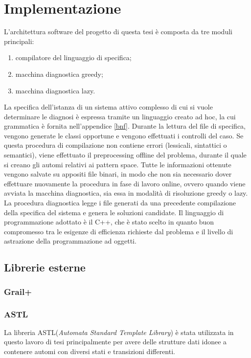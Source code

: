 \chapter{Implementazione}
L'architettura software del progetto di questa tesi è composta da tre moduli principali:
\begin{enumerate}
\item compilatore del linguaggio di specifica;
\item macchina diagnostica greedy;
\item macchina diagnostica lazy.
\end{enumerate}
La specifica dell'istanza di un sistema attivo complesso di cui si vuole determinare le diagnosi è espressa tramite un linguaggio creato ad hoc, la cui grammatica è fornita nell'appendice \ref{bnf}.
Durante la lettura del file di specifica, vengono generate le classi opportune e vengono effettuati i controlli del caso. Se questa procedura di compilazione non contiene errori (lessicali, sintattici o semantici), viene effettuato il preprocessing offline del problema, durante il quale si creano gli automi relativi ai pattern space. Tutte le informazioni ottenute vengono salvate su appositi file binari, in modo che non sia necessario dover effettuare nuovamente la procedura in fase di lavoro online, ovvero quando viene avviata la macchina diagnostica, sia essa in modalità di risoluzione greedy o lazy. 
La procedura diagnostica legge i file generati da una precedente compilazione della specifica del sistema e genera le soluzioni candidate. 
Il linguaggio di programmazione adottato è il C++, che è stato scelto in quanto buon compromesso tra le esigenze di efficienza richieste dal problema e il livello di astrazione della programmazione ad oggetti.

\section{Librerie esterne}
\subsection{Grail+}

\subsection{ASTL}
La libreria ASTL(\emph{Automata Standard Template Library})\cite{web:astl} è stata utilizzata in questo lavoro di tesi principalmente per avere delle strutture dati idonee a contenere automi con diversi stati e transizioni differenti. 

